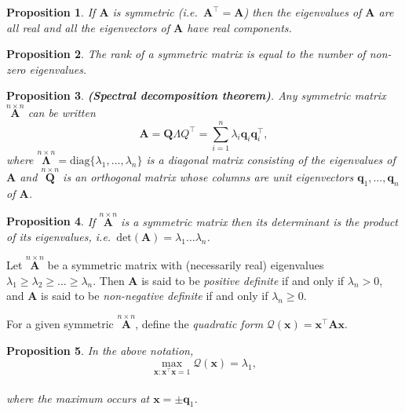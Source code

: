 \documentclass[]{book}
\newtheorem{proposition}{Proposition}[chapter]
\theoremstyle{definition}
\theoremstyle{definition}
\theoremstyle{definition}
\theoremstyle{remark}
\begin{document}
\begin{proposition}
\protect\hypertarget{prp:unnamed-chunk-3}{}{\label{prp:unnamed-chunk-3} }If \(\mathbf A\) is symmetric (i.e.~\({\mathbf A}^\top ={\mathbf A}\)) then the
eigenvalues of \(\mathbf A\) are all \emph{real} and all the eigenvectors of \(\mathbf A\) have
\emph{real} components.
\end{proposition}

\begin{proposition}
\protect\hypertarget{prp:unnamed-chunk-4}{}{\label{prp:unnamed-chunk-4} }The rank of a symmetric matrix is equal to the number of non-zero eigenvalues.
\end{proposition}

\begin{proposition}
\protect\hypertarget{prp:spectraldecomp}{}{\label{prp:spectraldecomp} }\textbf{(Spectral decomposition theorem)}. Any symmetric matrix \(\stackrel{n\times n}{\mathbf A}\) can
be written
\[ {\mathbf A}={\mathbf Q \Lambda Q}^\top = \sum _{i=1}^{n} \lambda _i {\mathbf q}_i {\mathbf q}_i^\top ,\]
where \(\stackrel{n\times n}{\mathbf \Lambda}=\text{diag}\{ \lambda _1, \dots , \lambda _n \}\) is
a diagonal matrix consisting of the eigenvalues of \(\mathbf A\) and \(\stackrel{n\times n}{\mathbf Q}\) is
an orthogonal matrix whose columns are unit eigenvectors
\({\mathbf q}_1, \dots , {\mathbf q}_n\) of \(\mathbf A\).
\end{proposition}

\begin{proposition}
\protect\hypertarget{prp:unnamed-chunk-5}{}{\label{prp:unnamed-chunk-5} }If \(\stackrel{n\times n}{\mathbf A}\) is a symmetric matrix
then its determinant is the product of its eigenvalues, i.e.~\(\text{det}({\mathbf A})=\lambda _1 \dots \lambda _n\).
\end{proposition}

Let \(\stackrel{n\times n}{\mathbf A}\) be a symmetric matrix
with (necessarily real) eigenvalues \(\lambda _1 \geq \lambda _2 \geq \dots \geq \lambda _n\). Then \(\mathbf A\) is said to be \emph{positive definite}
if and only if \(\lambda _n >0\), and \(\boldsymbol A\) is said to be \emph{non-negative definite} if and only if \(\lambda _n\geq 0\).

For a given symmetric \(\stackrel{n\times n}{\mathbf A}\), define the
\emph{quadratic form}
\(\mathcal{Q}({\mathbf x})={\mathbf x}^\top {\mathbf A} {\mathbf x}\).

\begin{proposition}
\protect\hypertarget{prp:two8}{}{\label{prp:two8} }In the above notation,
\[\max_{\boldsymbol x: \boldsymbol x^\top \boldsymbol x=1} \mathcal{Q}({\mathbf x})=\lambda_1,\]\\
where the maximum occurs at \(\boldsymbol x=\pm \boldsymbol q_1\).
\end{proposition}
\end{document}
